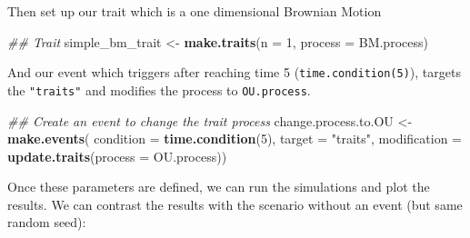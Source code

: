 \documentclass[
]{book}
\newenvironment{Shaded}{\begin{snugshade}}{\end{snugshade}}
\newcommand{\CommentTok}[1]{\textcolor[rgb]{0.56,0.35,0.01}{\textit{#1}}}
\newcommand{\DataTypeTok}[1]{\textcolor[rgb]{0.13,0.29,0.53}{#1}}
\newcommand{\DecValTok}[1]{\textcolor[rgb]{0.00,0.00,0.81}{#1}}
\newcommand{\KeywordTok}[1]{\textcolor[rgb]{0.13,0.29,0.53}{\textbf{#1}}}
\newcommand{\NormalTok}[1]{#1}
\newcommand{\StringTok}[1]{\textcolor[rgb]{0.31,0.60,0.02}{#1}}
\begin{document}
Then set up our trait which is a one dimensional Brownian Motion

\begin{Shaded}
\begin{Highlighting}[]
\CommentTok{\#\# Trait}
\NormalTok{simple\_bm\_trait \textless{}{-}}\StringTok{ }\KeywordTok{make.traits}\NormalTok{(}\DataTypeTok{n =} \DecValTok{1}\NormalTok{, }\DataTypeTok{process =}\NormalTok{ BM.process)}
\end{Highlighting}
\end{Shaded}

And our event which triggers after reaching time 5 (\texttt{time.condition(5)}), targets the \texttt{"traits"} and modifies the process to \texttt{OU.process}.

\begin{Shaded}
\begin{Highlighting}[]
\CommentTok{\#\# Create an event to change the trait process}
\NormalTok{change.process.to.OU \textless{}{-}}\StringTok{ }\KeywordTok{make.events}\NormalTok{(}
                  \DataTypeTok{condition    =} \KeywordTok{time.condition}\NormalTok{(}\DecValTok{5}\NormalTok{),}
                  \DataTypeTok{target       =} \StringTok{"traits"}\NormalTok{,}
                  \DataTypeTok{modification =} \KeywordTok{update.traits}\NormalTok{(}\DataTypeTok{process =}\NormalTok{ OU.process))}
\end{Highlighting}
\end{Shaded}

Once these parameters are defined, we can run the simulations and plot the results.
We can contrast the results with the scenario without an event (but same random seed):
\end{document}
